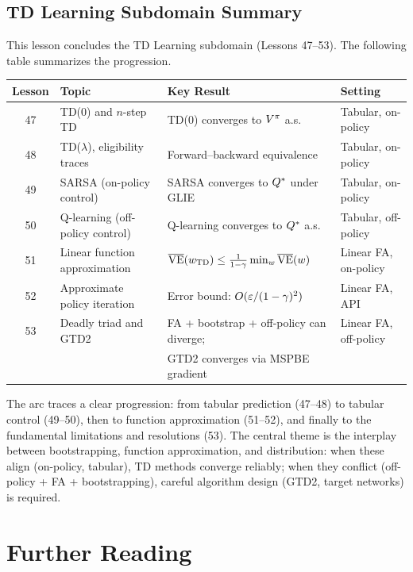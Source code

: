 \documentclass[11pt,a4paper]{article}
\begin{document}
\subsection*{TD Learning Subdomain Summary}
\label{subsec:subdomain_summary}

This lesson concludes the TD Learning subdomain (Lessons 47--53).
The following table summarizes the progression.

\begin{center}
\begin{tabular}{clll}
\toprule
\textbf{Lesson} & \textbf{Topic} & \textbf{Key Result}
  & \textbf{Setting} \\
\midrule
47 & TD(0) and $n$-step TD
  & TD(0) converges to $V^\pi$ a.s.
  & Tabular, on-policy \\
48 & TD($\lambda$), eligibility traces
  & Forward--backward equivalence
  & Tabular, on-policy \\
49 & SARSA (on-policy control)
  & SARSA converges to $Q^*$ under GLIE
  & Tabular, on-policy \\
50 & Q-learning (off-policy control)
  & Q-learning converges to $Q^*$ a.s.
  & Tabular, off-policy \\
51 & Linear function approximation
  & $\overline{\mathrm{VE}}(w_{\mathrm{TD}})
    \leq \frac{1}{1-\gamma}\min_w \overline{\mathrm{VE}}(w)$
  & Linear FA, on-policy \\
52 & Approximate policy iteration
  & Error bound: $O(\varepsilon/(1-\gamma)^2)$
  & Linear FA, API \\
53 & Deadly triad and GTD2
  & FA + bootstrap + off-policy can diverge;
  & Linear FA, off-policy \\
  & & GTD2 converges via MSPBE gradient & \\
\bottomrule
\end{tabular}
\end{center}

The arc traces a clear progression: from tabular prediction (47--48)
to tabular control (49--50), then to function approximation (51--52),
and finally to the fundamental limitations and resolutions (53). The
central theme is the interplay between bootstrapping, function
approximation, and distribution: when these align (on-policy,
tabular), TD methods converge reliably; when they conflict
(off-policy + FA + bootstrapping), careful algorithm design (GTD2,
target networks) is required.

\section{Further Reading}
\label{sec:further_reading}
\end{document}
